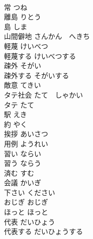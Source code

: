 \documentclass[8pt]{extreport}
\begin{document}
\begin{CJK}{UTF8}{min}
\\	常	つね	
\\	離島	りとう	
\\	島	しま	
\\	山間僻地	さんかん　へきち	
\\	軽蔑	けいべつ	
\\	軽蔑する	けいべつする	
\\	疎外	そがい	
\\	疎外する	そがいする	
\\	敵意	てきい	
\\	タテ社会	たて　しゃかい	
\\	タテ	たて	
\\	駅	えき	
\\	約	やく	
\\	挨拶	あいさつ	
\\	用例	ようれい	
\\	習い	ならい	
\\	習う	ならう	
\\	済む	すむ	
\\	会議	かいぎ	
\\	下さい	ください	
\\	おじぎ	おじぎ	
\\	ほっと	ほっと	
\\	代表	だいひょう	
\\	代表する	だいひょうする	
\end{CJK}
\end{document}
